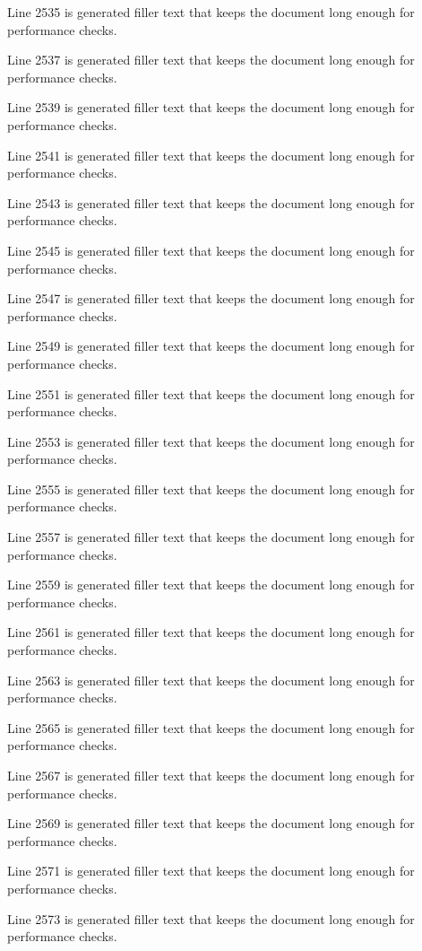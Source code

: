 Line 2535 is generated filler text that keeps the document long enough for performance checks.

Line 2537 is generated filler text that keeps the document long enough for performance checks.

Line 2539 is generated filler text that keeps the document long enough for performance checks.

Line 2541 is generated filler text that keeps the document long enough for performance checks.

Line 2543 is generated filler text that keeps the document long enough for performance checks.

Line 2545 is generated filler text that keeps the document long enough for performance checks.

Line 2547 is generated filler text that keeps the document long enough for performance checks.

Line 2549 is generated filler text that keeps the document long enough for performance checks.

Line 2551 is generated filler text that keeps the document long enough for performance checks.

Line 2553 is generated filler text that keeps the document long enough for performance checks.

Line 2555 is generated filler text that keeps the document long enough for performance checks.

Line 2557 is generated filler text that keeps the document long enough for performance checks.

Line 2559 is generated filler text that keeps the document long enough for performance checks.

Line 2561 is generated filler text that keeps the document long enough for performance checks.

Line 2563 is generated filler text that keeps the document long enough for performance checks.

Line 2565 is generated filler text that keeps the document long enough for performance checks.

Line 2567 is generated filler text that keeps the document long enough for performance checks.

Line 2569 is generated filler text that keeps the document long enough for performance checks.

Line 2571 is generated filler text that keeps the document long enough for performance checks.

Line 2573 is generated filler text that keeps the document long enough for performance checks.

